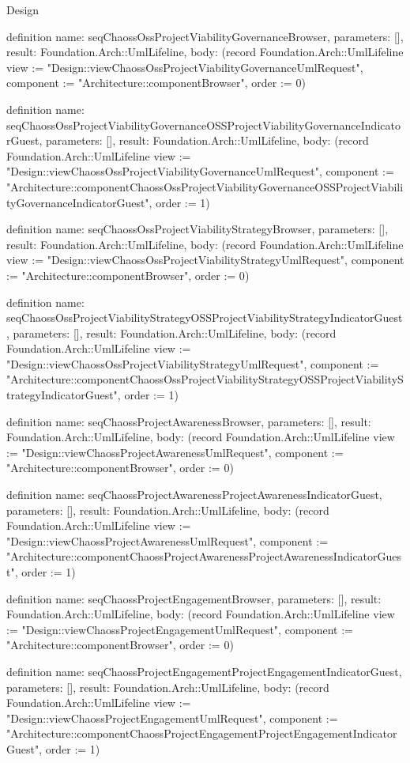 \begin{lexlean}{Design}
\begin{semanticmodule}
definition{
  name: seqChaossOssProjectViabilityGovernanceBrowser,
  parameters: [],
  result: Foundation.Arch::UmlLifeline,
  body: (record Foundation.Arch::UmlLifeline {view := "Design::viewChaossOssProjectViabilityGovernanceUmlRequest", component := "Architecture::componentBrowser", order := 0})
}

definition{
  name: seqChaossOssProjectViabilityGovernanceOSSProjectViabilityGovernanceIndicatorGuest,
  parameters: [],
  result: Foundation.Arch::UmlLifeline,
  body: (record Foundation.Arch::UmlLifeline {view := "Design::viewChaossOssProjectViabilityGovernanceUmlRequest", component := "Architecture::componentChaossOssProjectViabilityGovernanceOSSProjectViabilityGovernanceIndicatorGuest", order := 1})
}

definition{
  name: seqChaossOssProjectViabilityStrategyBrowser,
  parameters: [],
  result: Foundation.Arch::UmlLifeline,
  body: (record Foundation.Arch::UmlLifeline {view := "Design::viewChaossOssProjectViabilityStrategyUmlRequest", component := "Architecture::componentBrowser", order := 0})
}

definition{
  name: seqChaossOssProjectViabilityStrategyOSSProjectViabilityStrategyIndicatorGuest,
  parameters: [],
  result: Foundation.Arch::UmlLifeline,
  body: (record Foundation.Arch::UmlLifeline {view := "Design::viewChaossOssProjectViabilityStrategyUmlRequest", component := "Architecture::componentChaossOssProjectViabilityStrategyOSSProjectViabilityStrategyIndicatorGuest", order := 1})
}

definition{
  name: seqChaossProjectAwarenessBrowser,
  parameters: [],
  result: Foundation.Arch::UmlLifeline,
  body: (record Foundation.Arch::UmlLifeline {view := "Design::viewChaossProjectAwarenessUmlRequest", component := "Architecture::componentBrowser", order := 0})
}

definition{
  name: seqChaossProjectAwarenessProjectAwarenessIndicatorGuest,
  parameters: [],
  result: Foundation.Arch::UmlLifeline,
  body: (record Foundation.Arch::UmlLifeline {view := "Design::viewChaossProjectAwarenessUmlRequest", component := "Architecture::componentChaossProjectAwarenessProjectAwarenessIndicatorGuest", order := 1})
}

definition{
  name: seqChaossProjectEngagementBrowser,
  parameters: [],
  result: Foundation.Arch::UmlLifeline,
  body: (record Foundation.Arch::UmlLifeline {view := "Design::viewChaossProjectEngagementUmlRequest", component := "Architecture::componentBrowser", order := 0})
}

definition{
  name: seqChaossProjectEngagementProjectEngagementIndicatorGuest,
  parameters: [],
  result: Foundation.Arch::UmlLifeline,
  body: (record Foundation.Arch::UmlLifeline {view := "Design::viewChaossProjectEngagementUmlRequest", component := "Architecture::componentChaossProjectEngagementProjectEngagementIndicatorGuest", order := 1})
}


\end{semanticmodule}
\end{lexlean}
